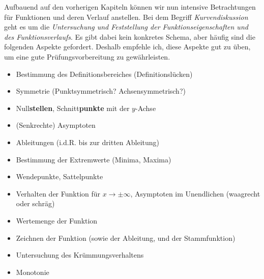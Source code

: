 \documentclass[ngerman, 12pt]{nssheetxea}
\begin{document}
Aufbauend auf den vorherigen Kapiteln können wir nun intensive Betrachtungen für Funktionen und deren Verlauf anstellen. Bei dem Begriff \textit{Kurvendiskussion} geht es um die \textit{Untersuchung und Feststellung der Funktionseigenschaften und des Funktionsverlaufs}. Es gibt dabei kein konkretes Schema, aber häufig sind die folgenden Aspekte gefordert. Deshalb empfehle ich, diese Aspekte gut zu üben, um eine gute Prüfungsvorbereitung zu gewährleisten.
\begin{itemize}
\item Bestimmung des Definitionsbereiches (Definitionslücken)
\item Symmetrie (Punktsymmetrisch? Achsensymmetrisch?)
\item Null\textbf{stellen}, Schnitt\textbf{punkte} mit der $y$-Achse
\item (Senkrechte) Asymptoten
\item Ableitungen (i.d.R. bis zur dritten Ableitung)
\item Bestimmung der Extremwerte (Minima, Maxima)
\item Wendepunkte, Sattelpunkte
\item Verhalten der Funktion für $x\rightarrow \pm \infty$, Asymptoten im Unendlichen (waagrecht oder schräg)
\item Wertemenge der Funktion
\item Zeichnen der Funktion (sowie der Ableitung, und der Stammfunktion)
\item Untersuchung des Krümmungsverhaltens
\item Monotonie
\end{itemize}
\end{document}

